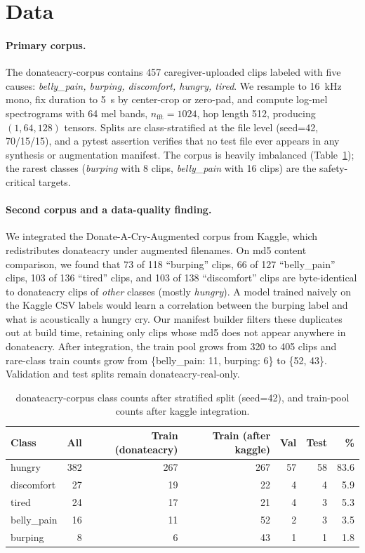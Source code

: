 \documentclass[final]{article}
\begin{document}
\section{Data}\label{sec:data}
\paragraph{Primary corpus.} The donateacry-corpus \cite{donateacry} contains 457 caregiver-uploaded clips labeled with five causes: \textit{belly\_pain, burping, discomfort, hungry, tired}. We resample to 16~kHz mono, fix duration to 5~s by center-crop or zero-pad, and compute log-mel spectrograms with 64 mel bands, $n_{\text{fft}}=1024$, hop length 512, producing $(1, 64, 128)$ tensors. Splits are class-stratified at the file level (seed=42, 70/15/15), and a pytest assertion verifies that no test file ever appears in any synthesis or augmentation manifest. The corpus is heavily imbalanced (Table~\ref{tab:counts}); the rarest classes (\textit{burping} with 8 clips, \textit{belly\_pain} with 16 clips) are the safety-critical targets.

\paragraph{Second corpus and a data-quality finding.} We integrated the Donate-A-Cry-Augmented corpus from Kaggle, which redistributes donateacry under augmented filenames. On md5 content comparison, we found that 73 of 118 ``burping'' clips, 66 of 127 ``belly\_pain'' clips, 103 of 136 ``tired'' clips, and 103 of 138 ``discomfort'' clips are byte-identical to donateacry clips of \emph{other} classes (mostly \textit{hungry}). A model trained naively on the Kaggle CSV labels would learn a correlation between the burping label and what is acoustically a hungry cry. Our manifest builder filters these duplicates out at build time, retaining only clips whose md5 does not appear anywhere in donateacry. After integration, the train pool grows from 320 to 405 clips and rare-class train counts grow from \{belly\_pain: 11, burping: 6\} to \{52, 43\}. Validation and test splits remain donateacry-real-only.

\begin{table}[H]
\centering
\caption{donateacry-corpus class counts after stratified split (seed=42), and train-pool counts after kaggle integration.}\label{tab:counts}
\begin{tabular}{lrrrrrr}
\toprule
Class & All & Train (donateacry) & Train (after kaggle) & Val & Test & \% \\
\midrule
hungry      & 382 & 267 & 267 & 57 & 58 & 83.6 \\
discomfort  & 27  & 19  & 22  & 4  & 4  & 5.9 \\
tired       & 24  & 17  & 21  & 4  & 3  & 5.3 \\
belly\_pain & 16  & 11  & 52  & 2  & 3  & 3.5 \\
burping     & 8   & 6   & 43  & 1  & 1  & 1.8 \\
\bottomrule
\end{tabular}
\end{table}
\end{document}
